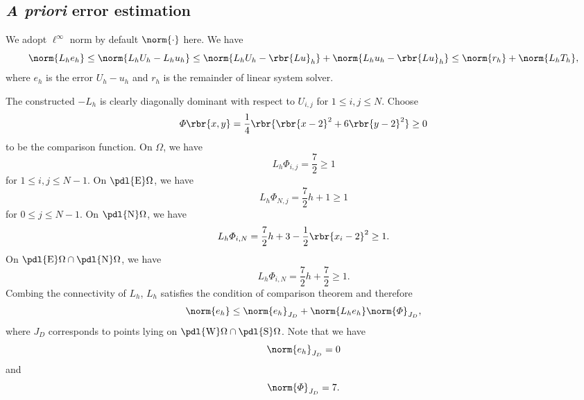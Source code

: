 \documentclass[english, nochinese]{pnote}
\begin{document}
\subsection{\textit{A priori} error estimation}

We adopt $\ell^{\infty}$ norm by default $\norm{\cdot}$ here. We have
\begin{equation}
\norm{ L_h e_h } \le \norm{ L_h U_h - L_h u_h } \le \norm{ L_h U_h - \rbr{ L u }_h } + \norm{ L_h u_h - \rbr{ L u }_h } \le \norm{r_h} + \norm{ L_h T_h },
\end{equation}
where $e_h$ is the error $ U_h - u_h $ and $r_h$ is the remainder of linear system solver.

The constructed $-L_h$ is clearly diagonally dominant with respect to $ U_{ i, j } $ for $ 1 \le i, j \le N $. Choose
\begin{equation}
\varPhi \rbr{ x, y } = \frac{1}{4} \rbr{ \rbr{ x - 2 }^2 + 6 \rbr{ y - 2 }^2 } \ge 0
\end{equation}
to be the comparison function. On $\Omega$, we have
\begin{equation}
L_h \varPhi_{ i, j } = \frac{7}{2} \ge 1
\end{equation}
for $ 1 \le i, j \le N - 1 $.
On $ \pdl{\text{E}} \Omega $, we have
\begin{equation}
L_h \varPhi_{ N, j } = \frac{7}{2} h + 1 \ge 1
\end{equation}
for $ 0 \le j \le N - 1 $.
On $ \pdl{\text{N}} \Omega $, we have
\begin{equation}
L_h \varPhi_{ i, N } = \frac{7}{2} h + 3 - \frac{1}{2} \rbr{ x_i - 2 }^2 \ge 1.
\end{equation}
On $ \pdl{\text{E}} \Omega \cap \pdl{\text{N}} \Omega $, we have
\begin{equation}
L_h \varPhi_{ i, N } = \frac{7}{2} h + \frac{7}{2} \ge 1.
\end{equation}
Combing the connectivity of $L_h$, $L_h$ satisfies the condition of comparison theorem and therefore
\begin{equation}
\norm{e_h} \le \norm{e_h}_{J_D} + \norm{ L_h e_h } \norm{\varPhi}_{J_D},
\end{equation}
where $J_D$ corresponds to points lying on $ \pdl{\text{W}} \Omega \cap \pdl{\text{S}} \Omega $. Note that we have
\begin{equation}
\norm{e_h}_{J_D} = 0
\end{equation}
and
\begin{equation}
\norm{\varPhi}_{J_D} = 7.
\end{equation}
\end{document}
